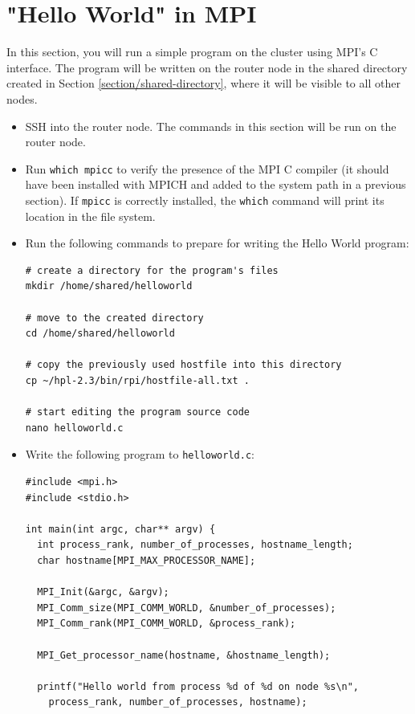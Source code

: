 \documentclass{article}
\begin{document}
\section{"Hello World" in MPI}

In this section, you will run a simple program on the cluster using MPI's C interface. The program will be written on the router node in the shared directory created in Section \ref{section/shared-directory}, where it will be visible to all other nodes.

\begin{itemize}
    \item SSH into the router node. The commands in this section will be run on the router node.

    \item Run \texttt{which mpicc} to verify the presence of the MPI C compiler (it should have been installed with MPICH and added to the system path in a previous section). If \texttt{mpicc} is correctly installed, the \texttt{which} command will print its location in the file system.
    
    \item Run the following commands to prepare for writing the Hello World program:
\begin{verbatim}
# create a directory for the program's files
mkdir /home/shared/helloworld

# move to the created directory
cd /home/shared/helloworld

# copy the previously used hostfile into this directory
cp ~/hpl-2.3/bin/rpi/hostfile-all.txt .

# start editing the program source code
nano helloworld.c
\end{verbatim}

    \item Write the following program to \texttt{helloworld.c}:

\begin{verbatim}
#include <mpi.h>
#include <stdio.h>

int main(int argc, char** argv) {
  int process_rank, number_of_processes, hostname_length;
  char hostname[MPI_MAX_PROCESSOR_NAME];

  MPI_Init(&argc, &argv);
  MPI_Comm_size(MPI_COMM_WORLD, &number_of_processes);
  MPI_Comm_rank(MPI_COMM_WORLD, &process_rank);

  MPI_Get_processor_name(hostname, &hostname_length);

  printf("Hello world from process %d of %d on node %s\n", 
    process_rank, number_of_processes, hostname);


\end{verbatim}
\end{itemize}
\end{document}
